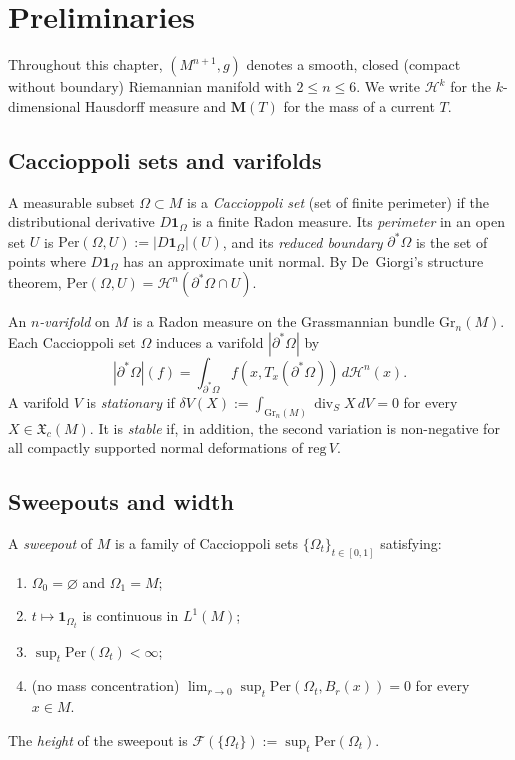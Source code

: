 \section{Preliminaries}\label{sec:p2-prelim}

Throughout this chapter, $(M^{n+1}, g)$ denotes a smooth, closed (compact without boundary) Riemannian manifold with $2 \leq n \leq 6$. We write $\mathcal{H}^k$ for the $k$-dimensional Hausdorff measure and $\mathbf{M}(T)$ for the mass of a current $T$.

\subsection{Caccioppoli sets and varifolds}

A measurable subset $\Omega \subset M$ is a \emph{Caccioppoli set} (set of finite perimeter) if the distributional derivative $D\mathbf{1}_\Omega$ is a finite Radon measure. Its \emph{perimeter} in an open set $U$ is $\mathrm{Per}(\Omega, U) := |D\mathbf{1}_\Omega|(U)$, and its \emph{reduced boundary} $\partial^*\Omega$ is the set of points where $D\mathbf{1}_\Omega$ has an approximate unit normal. By De~Giorgi's structure theorem, $\mathrm{Per}(\Omega, U) = \mathcal{H}^n(\partial^*\Omega \cap U)$.

An \emph{$n$-varifold} on $M$ is a Radon measure on the Grassmannian bundle $\mathrm{Gr}_n(M)$. Each Caccioppoli set $\Omega$ induces a varifold $|\partial^*\Omega|$ by
\[
|\partial^*\Omega|(f) = \int_{\partial^*\Omega} f(x, T_x(\partial^*\Omega))\, d\mathcal{H}^n(x).
\]
A varifold $V$ is \emph{stationary} if $\delta V(X) := \int_{\mathrm{Gr}_n(M)} \operatorname{div}_S X \, dV = 0$ for every $X \in \mathfrak{X}_c(M)$. It is \emph{stable} if, in addition, the second variation is non-negative for all compactly supported normal deformations of $\mathrm{reg}\, V$.

\subsection{Sweepouts and width}

\begin{definition}[Sweepout]\label{def:p2-sweepout}
A \emph{sweepout} of $M$ is a family of Caccioppoli sets $\{\Omega_t\}_{t \in [0,1]}$ satisfying:
\begin{enumerate}[label=\textup{(\roman*)}]
    \item $\Omega_0 = \varnothing$ and $\Omega_1 = M$;
    \item $t \mapsto \mathbf{1}_{\Omega_t}$ is continuous in $L^1(M)$;
    \item $\sup_{t} \mathrm{Per}(\Omega_t) < \infty$;
    \item (no mass concentration) $\lim_{r \to 0} \sup_{t} \mathrm{Per}(\Omega_t, B_r(x)) = 0$ for every $x \in M$.
\end{enumerate}
The \emph{height} of the sweepout is $\mathcal{F}(\{\Omega_t\}) := \sup_{t} \mathrm{Per}(\Omega_t)$.
\end{definition}

